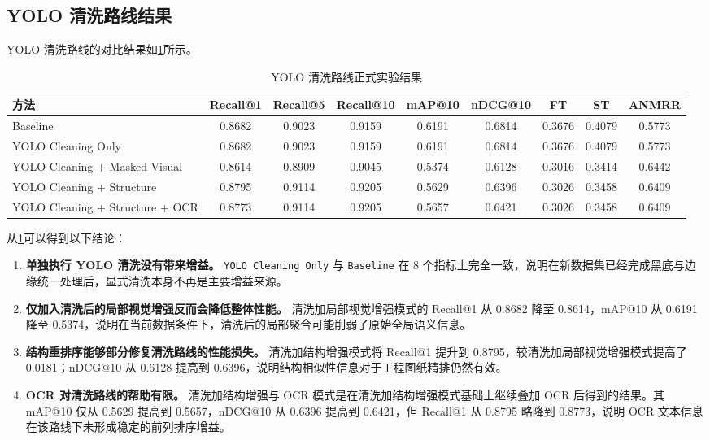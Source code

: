 \subsection{YOLO 清洗路线结果}

YOLO 清洗路线的对比结果如\cref{tab:yolo-route-results}所示。

\begin{table}[htbp]
  \centering
  \caption{YOLO 清洗路线正式实验结果}
  \label{tab:yolo-route-results}
  \begin{adjustbox}{width=\textwidth}
    \small
    \setlength{\tabcolsep}{3.8pt}
    \begin{tabular}{p{4.4cm}cccccccc}
      \toprule
      方法 & Recall@1 & Recall@5 & Recall@10 & mAP@10 & nDCG@10 & FT & ST & ANMRR \\
      \midrule
      Baseline & 0.8682 & 0.9023 & 0.9159 & 0.6191 & 0.6814 & 0.3676 & 0.4079 & 0.5773 \\
      YOLO Cleaning Only & 0.8682 & 0.9023 & 0.9159 & 0.6191 & 0.6814 & 0.3676 & 0.4079 & 0.5773 \\
      YOLO Cleaning + Masked Visual & 0.8614 & 0.8909 & 0.9045 & 0.5374 & 0.6128 & 0.3016 & 0.3414 & 0.6442 \\
      YOLO Cleaning + Structure & 0.8795 & 0.9114 & 0.9205 & 0.5629 & 0.6396 & 0.3026 & 0.3458 & 0.6409 \\
      YOLO Cleaning + Structure + OCR & 0.8773 & 0.9114 & 0.9205 & 0.5657 & 0.6421 & 0.3026 & 0.3458 & 0.6409 \\
      \bottomrule
    \end{tabular}
  \end{adjustbox}
\end{table}

从\cref{tab:yolo-route-results}可以得到以下结论：
\begin{enumerate}
  \item \textbf{单独执行 YOLO 清洗没有带来增益。} \texttt{YOLO Cleaning Only} 与 \texttt{Baseline} 在 8 个指标上完全一致，说明在新数据集已经完成黑底与边缘统一处理后，显式清洗本身不再是主要增益来源。
  \item \textbf{仅加入清洗后的局部视觉增强反而会降低整体性能。} 清洗加局部视觉增强模式的 Recall@1 从 0.8682 降至 0.8614，mAP@10 从 0.6191 降至 0.5374，说明在当前数据条件下，清洗后的局部聚合可能削弱了原始全局语义信息。
  \item \textbf{结构重排序能够部分修复清洗路线的性能损失。} 清洗加结构增强模式将 Recall@1 提升到 0.8795，较清洗加局部视觉增强模式提高了 0.0181；nDCG@10 从 0.6128 提高到 0.6396，说明结构相似性信息对于工程图纸精排仍然有效。
  \item \textbf{OCR 对清洗路线的帮助有限。} 清洗加结构增强与 OCR 模式是在清洗加结构增强模式基础上继续叠加 OCR 后得到的结果。其 mAP@10 仅从 0.5629 提高到 0.5657，nDCG@10 从 0.6396 提高到 0.6421，但 Recall@1 从 0.8795 略降到 0.8773，说明 OCR 文本信息在该路线下未形成稳定的前列排序增益。
\end{enumerate}

